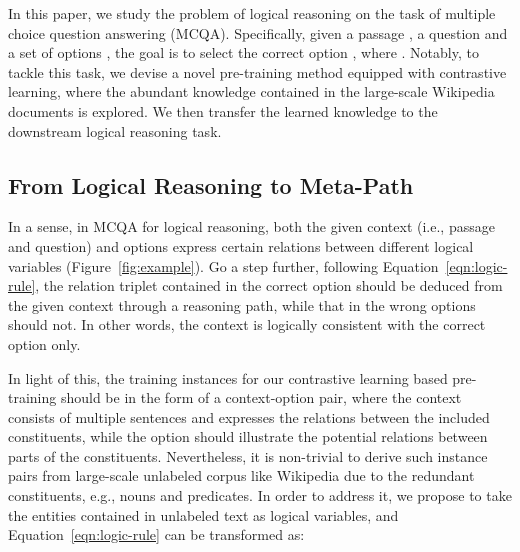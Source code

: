 




In this paper, we study the problem of logical reasoning on the task of multiple choice question answering (MCQA). 
Specifically, given a passage , a question  and a set of  options , the goal is to select the correct option , where .
Notably, to tackle this task, we devise a novel pre-training method equipped with contrastive learning, where the abundant knowledge contained in the large-scale Wikipedia documents is explored.
We then transfer the learned knowledge to the downstream logical reasoning task.


\subsection{From Logical Reasoning to Meta-Path}



In a sense, in MCQA for logical reasoning, both the given context (i.e., passage and question) and options express certain relations between different logical variables (Figure~\ref{fig:example}). 
Go a step further, following Equation~\ref{eqn:logic-rule}, the relation triplet contained in the correct option should be deduced from the given context through a reasoning path,
while that in the wrong options should not. 
In other words, the context is logically consistent with the correct option only.








In light of this, the training instances for our contrastive learning based pre-training should be in the form of a context-option pair, where the context consists of multiple sentences and expresses the relations between the included constituents, while the option should illustrate the potential relations between parts of the constituents.  
Nevertheless, it is non-trivial to derive such instance pairs from large-scale unlabeled corpus like Wikipedia due to the redundant constituents, e.g., nouns and predicates.
In order to address it, we propose to take the entities contained in unlabeled text as logical variables, and Equation~\ref{eqn:logic-rule} can be transformed as:

